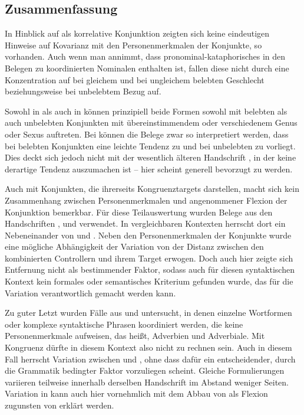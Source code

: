 \subsection{Zusammenfassung}

In Hinblick auf   als
korrelative Konjunktion zeigten sich keine eindeutigen Hinweise auf Kovarianz
mit den Personenmerkmalen der Konjunkte, so vorhanden. Auch wenn man annimmt,
dass pronominal-kataphorisches  in den Belegen zu koordinierten
Nominalen enthalten ist, fallen diese nicht durch eine Konzentration auf
 bei gleichem und  bei ungleichem belebten Geschlecht
beziehungsweise bei unbelebtem Bezug auf.

Sowohl in \citet{kc:A1} als auch in \citet{kc:VB} können prinzipiell beide
Formen sowohl mit belebten als auch unbelebten Konjunkten mit
über\-einstim\-mendem oder verschiedenem Genus oder Sexus auftreten. Bei
\citet{kc:VB} können die Belege zwar so interpretiert werden, dass bei belebten
Konjunkten eine leichte Tendenz zu  und bei unbelebten zu
 vorliegt. Dies deckt sich jedoch nicht mit der wesentlich älteren
Handschrift \citet{kc:A1}, in der keine derartige Tendenz auszumachen ist --
hier scheint generell  bevorzugt zu werden.

Auch mit Konjunkten, die ihrerseits Kongruenztargets darstellen, macht sich
kein Zusammen\-hang zwischen Personen\-merkmalen und angenommener Flexion der
Konjunktion bemerkbar. Für diese Teilauswertung wurden Belege aus den
Handschriften \citet{kc:A1}, \citet{kc:B1} und \citet{kc:VB} verwendet. In
vergleichbaren Kontexten herrscht dort ein Nebeneinander von  und
. Neben den Personenmerkmalen der Konjunkte wurde eine mögliche
Abhängigkeit der Variation von der Distanz zwischen den kombinierten
Controllern und ihrem Target erwogen. Doch auch hier zeigte sich Entfernung
nicht als bestimmender Faktor, sodass auch für diesen syntaktischen Kontext kein
formales oder semantisches Kriterium gefunden wurde, das für die Variation
verantwortlich gemacht werden kann.

Zu guter Letzt wurden Fälle aus \citet{kc:B1} und \citet{kc:VB} untersucht, in
denen einzelne Wortformen oder komplexe syntaktische Phrasen koordiniert werden,
die keine Personenmerkmale aufweisen, das heißt, Adverbien und Adverbiale. Mit
Kongruenz dürfte in diesem Kontext also nicht zu rechnen sein. Auch in diesem
Fall herrscht Variation zwischen  und , ohne dass
dafür ein entscheidender, durch die Grammatik bedingter Faktor vorzuliegen
scheint. Gleiche Formulierungen variieren teilweise innerhalb derselben
Handschrift im Abstand weniger Seiten. Variation in \citet{kc:VB} kann auch
hier vornehmlich mit dem Abbau von  als Flexion zugunsten von
 erklärt werden.
